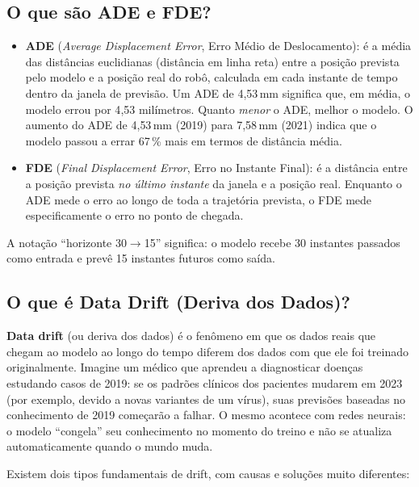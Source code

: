\documentclass[11pt,a4paper]{article}
\begin{document}
\subsection*{O que s\~ao ADE e FDE?}

\begin{itemize}[leftmargin=1.4em,itemsep=2pt]
    \item \textbf{ADE} (\emph{Average Displacement Error}, Erro M\'edio de Deslocamento): \'e a m\'edia das dist\^ancias euclidianas (dist\^ancia em linha reta) entre a posi\c{c}\~ao prevista pelo modelo e a posi\c{c}\~ao real do rob\^o, calculada em cada instante de tempo dentro da janela de previs\~ao. Um ADE de 4{,}53\,mm significa que, em m\'edia, o modelo errou por 4{,}53 mil\'imetros. Quanto \emph{menor} o ADE, melhor o modelo. O aumento do ADE de 4{,}53\,mm (2019) para 7{,}58\,mm (2021) indica que o modelo passou a errar 67\,\% mais em termos de dist\^ancia m\'edia.
    \item \textbf{FDE} (\emph{Final Displacement Error}, Erro no Instante Final): \'e a dist\^ancia entre a posi\c{c}\~ao prevista \emph{no \'ultimo instante} da janela e a posi\c{c}\~ao real. Enquanto o ADE mede o erro ao longo de toda a trajet\'oria prevista, o FDE mede especificamente o erro no ponto de chegada.
\end{itemize}

A nota\c{c}\~ao ``horizonte 30$\to$15'' significa: o modelo recebe 30 instantes passados como entrada e prev\^e 15 instantes futuros como sa\'ida.

\subsection*{O que \'e Data Drift (Deriva dos Dados)?}

\textbf{Data drift} (ou deriva dos dados) \'e o fen\^omeno em que os dados reais que chegam ao modelo ao longo do tempo diferem dos dados com que ele foi treinado originalmente. Imagine um m\'edico que aprendeu a diagnosticar doen\c{c}as estudando casos de 2019: se os padr\~oes cl\'inicos dos pacientes mudarem em 2023 (por exemplo, devido a novas variantes de um v\'irus), suas previs\~oes baseadas no conhecimento de 2019 come\c{c}ar\~ao a falhar. O mesmo acontece com redes neurais: o modelo ``congela'' seu conhecimento no momento do treino e n\~ao se atualiza automaticamente quando o mundo muda.

Existem dois tipos fundamentais de drift, com causas e solu\c{c}\~oes muito diferentes:
\end{document}
